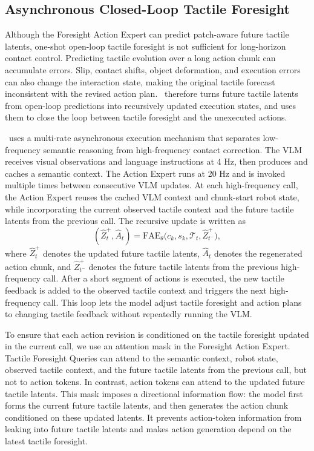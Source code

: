 \subsection{Asynchronous Closed-Loop Tactile Foresight}

Although the Foresight Action Expert can predict patch-aware future tactile latents, one-shot open-loop tactile foresight is not sufficient for long-horizon contact control. Predicting tactile evolution over a long action chunk can accumulate errors. Slip, contact shifts, object deformation, and execution errors can also change the interaction state, making the original tactile forecast inconsistent with the revised action plan. \systemname\ therefore turns future tactile latents from open-loop predictions into recursively updated execution states, and uses them to close the loop between tactile foresight and the unexecuted actions.

\systemname\ uses a multi-rate asynchronous execution mechanism that separates low-frequency semantic reasoning from high-frequency contact correction. The VLM receives visual observations and language instructions at 4 Hz, then produces and caches a semantic context. The Action Expert runs at 20 Hz and is invoked multiple times between consecutive VLM updates. At each high-frequency call, the Action Expert reuses the cached VLM context and chunk-start robot state, while incorporating the current observed tactile context and the future tactile latents from the previous call. The recursive update is written as
\begin{equation}
    (\hat{Z}_{t}^{+}, \hat{A}_{t})
    =
    \mathrm{FAE}_{\theta}
    \big(c_k, s_k, \mathcal{T}_t, \hat{Z}_{t^-}^{+}\big),
\end{equation}
where \(\hat{Z}_{t}^{+}\) denotes the updated future tactile latents, \(\hat{A}_{t}\) denotes the regenerated action chunk, and \(\hat{Z}_{t^-}^{+}\) denotes the future tactile latents from the previous high-frequency call. After a short segment of actions is executed, the new tactile feedback is added to the observed tactile context and triggers the next high-frequency call. This loop lets the model adjust tactile foresight and action plans to changing tactile feedback without repeatedly running the VLM.

To ensure that each action revision is conditioned on the tactile foresight updated in the current call, we use an attention mask in the Foresight Action Expert. Tactile Foresight Queries can attend to the semantic context, robot state, observed tactile context, and the future tactile latents from the previous call, but not to action tokens. In contrast, action tokens can attend to the updated future tactile latents. This mask imposes a directional information flow: the model first forms the current future tactile latents, and then generates the action chunk conditioned on these updated latents. It prevents action-token information from leaking into future tactile latents and makes action generation depend on the latest tactile foresight.

